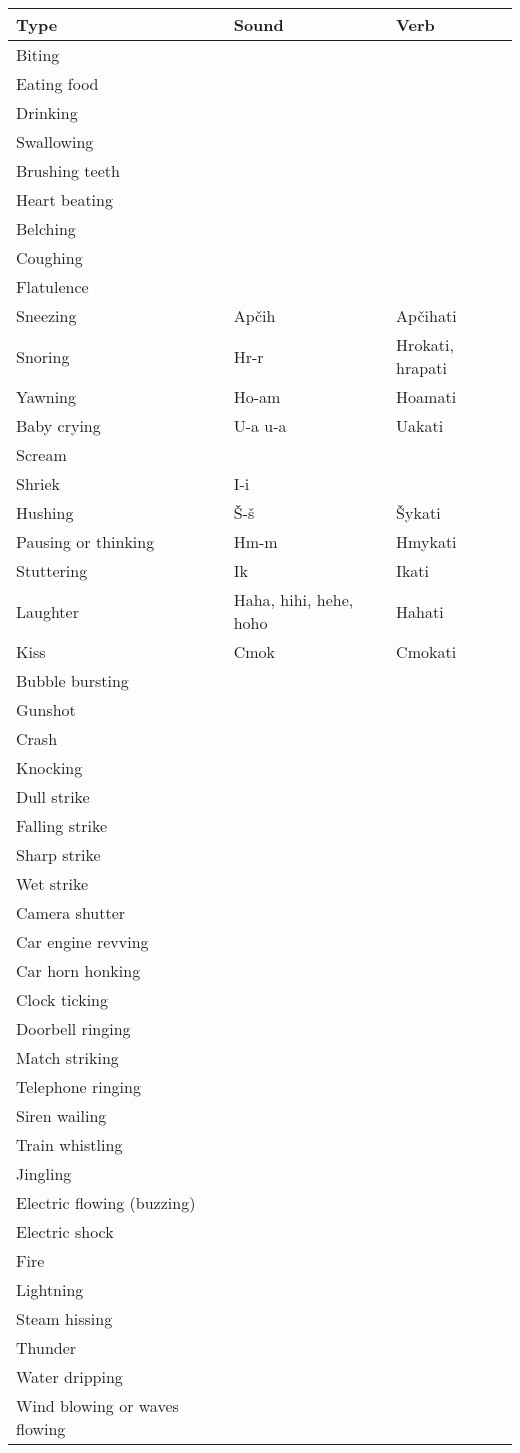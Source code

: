 \begin{longtable}{p{10em}p{5em}p{5em}}
		\textbf{Type} & \textbf{Sound} & \textbf{Verb} \\
		\endhead
		Biting && \\
		Eating food && \\
		Drinking && \\
		Swallowing && \\
		Brushing teeth && \\
		Heart beating && \\
		Belching && \\
		Coughing && \\
		Flatulence && \\
		Sneezing & Apčih & Apčihati \\
		Snoring & Hr-r & Hrokati, hrapati \\
		Yawning & Ho-am & Hoamati \\
		Baby crying & U-a u-a & Uakati \\
		Scream && \\
		Shriek & I-i & \\
		Hushing & Š-š & Šykati \\
		Pausing or thinking & Hm-m & Hmykati \\
		Stuttering & Ik & Ikati \\
		Laughter & Haha, hihi, hehe, hoho & Hahati \\
		Kiss & Cmok & Cmokati \\
		Bubble bursting && \\
		Gunshot && \\
		Crash && \\
		Knocking && \\ 
		Dull strike && \\
		Falling strike && \\
		Sharp strike && \\
		Wet strike && \\
		Camera shutter && \\
		Car engine revving && \\
		Car horn honking && \\
		Clock ticking && \\
		Doorbell ringing && \\
		Match striking && \\
		Telephone ringing && \\
		Siren wailing && \\
		Train whistling && \\
		Jingling && \\
		Electric flowing (buzzing) && \\
		Electric shock && \\
		Fire && \\
		Lightning && \\
		Steam hissing && \\
		Thunder && \\
		Water dripping && \\
		Wind blowing or waves flowing && \\
\end{longtable}